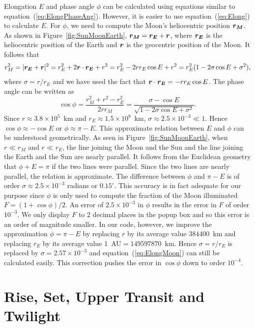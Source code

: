 \documentclass[12pt]{article}
\newcommand \beq {\begin{equation}}
\newcommand \eeq {\end{equation}}
\newcommand{\ve}[1]{\mbox{\boldmath $#1$}}
\begin{document}
Elongation $E$ and phase angle $\phi$ can be calculated using equations similar to 
equation~(\ref{eq:ElongPhaseAng}). However, it is easier to use 
equation~(\ref{eq:Elong}) to calculate $E$. For $\phi$, we need to 
compute the Moon's heliocentric position $\ve{r_M}$. As shown in 
Figure~\ref{fig:SunMoonEarth}, $\ve{r_M}=\ve{r_E}+\ve{r}$, where 
$\ve{r_E}$ is the heliocentric 
position of the Earth and $\ve{r}$ is the geocentric position of the Moon. 
It follows that 
\beq
  r_M^2 = |\ve{r_E}+\ve{r}|^2 = r_E^2 + 2\ve{r}\cdot \ve{r_E} + r^2 = 
r_E^2 - 2 r r_E \cos E+r^2 = r_E^2(1-2\sigma \cos E + \sigma^2) ,
\eeq
where $\sigma=r/r_E$ and we have used the fact that 
$\ve{r}\cdot \ve{r_E}=-r r_E \cos E$. The phase angle can be written as 
\beq
  \cos \phi = \frac{r_M^2+r^2-r_E^2}{2rr_M} = \frac{\sigma - \cos E}
{\sqrt{1-2\sigma\cos E + \sigma^2}} .
\label{eq:ElongMoon}
\eeq
Since $r \approx 3.8\times 10^{5}$~km and $r_E\approx 1.5\times 10^8$~km, 
$\sigma \approx 2.5\times 10^{-3} \ll 1$. Hence $\cos \phi \approx -\cos E$ or 
$\phi \approx \pi - E$. This approximate relation between $E$ and $\phi$ can 
be understood geometrically. As seen in Figure~\ref{fig:SunMoonEarth}, when 
$r \ll r_M$ and $r \ll r_E$, the line joining the Moon and the Sun and the 
line joining the Earth and the Sun are nearly parallel. It follows from the 
Euclidean geometry that $\phi + E = \pi$ if the two lines were parallel. Since 
the two lines are nearly parallel, the relation is approximate.
The difference between $\phi$ and $\pi - E$ is of 
order $\sigma \approx 2.5\times 10^{-3}$ radians or $0.15^\circ$. This accuracy 
is in fact adequate for our purpose since $\phi$ is only used to compute the 
fraction of the Moon illuminated $F=(1+\cos \phi)/2$. An error of $2.5\times 10^{-3}$ 
in $\phi$ results in the error in $F$ of order $10^{-3}$. We only display 
$F$ to 2 decimal places in the popup box 
and so this error is an order of magnitude smaller. In our code, however, 
we improve the approximation $\phi=\pi-E$ by replacing $r$ by its 
average value $384400$~km and replacing 
$r_E$ by its average value 1~AU$=149597870$~km. Hence $\sigma=r/r_E$ is replaced 
by $\sigma=2.57\times 10^{-3}$ and equation~(\ref{eq:ElongMoon}) can still 
be calculated easily. This correction pushes the error in $\cos \phi$ down to order 
$10^{-4}$.

\section{Rise, Set, Upper Transit and Twilight}
\end{document}
